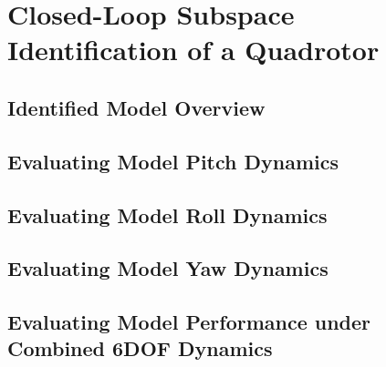 \chapter{Closed-Loop Subspace Identification of a Quadrotor}

\section{Identified Model Overview}


\section{Evaluating Model Pitch Dynamics}


\section{Evaluating Model Roll Dynamics}


\section{Evaluating Model Yaw Dynamics}


\section{Evaluating Model Performance under Combined 6DOF Dynamics}
